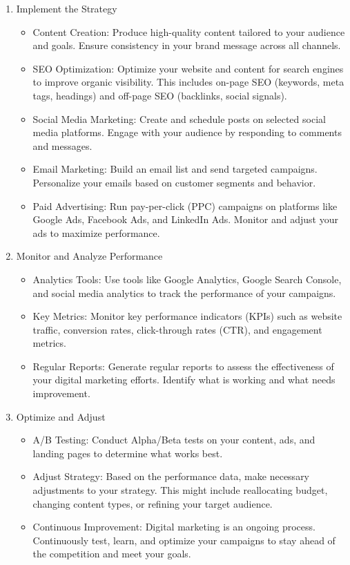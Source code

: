 \begin{enumerate}
    \item Implement the Strategy
    \begin{itemize}
        \item Content Creation: Produce high-quality content tailored to your audience and goals. Ensure consistency in your brand message across all channels.
        \item SEO Optimization: Optimize your website and content for search engines to improve organic visibility. This includes on-page SEO (keywords, meta tags, headings) and off-page SEO (backlinks, social signals).
        \item Social Media Marketing: Create and schedule posts on selected social media platforms. Engage with your audience by responding to comments and messages.
        \item Email Marketing: Build an email list and send targeted campaigns. Personalize your emails based on customer segments and behavior.
        \item Paid Advertising: Run pay-per-click (PPC) campaigns on platforms like Google Ads, Facebook Ads, and LinkedIn Ads. Monitor and adjust your ads to maximize performance.
    \end{itemize}

    \item Monitor and Analyze Performance
    \begin{itemize}
        \item Analytics Tools: Use tools like Google Analytics, Google Search Console, and social media analytics to track the performance of your campaigns.
        \item Key Metrics: Monitor key performance indicators (KPIs) such as website traffic, conversion rates, click-through rates (CTR), and engagement metrics.
        \item Regular Reports: Generate regular reports to assess the effectiveness of your digital marketing efforts. Identify what is working and what needs improvement.
    \end{itemize}

    \item Optimize and Adjust
    \begin{itemize}
        \item A/B Testing: Conduct Alpha/Beta tests on your content, ads, and landing pages to determine what works best.
        \item Adjust Strategy: Based on the performance data, make necessary adjustments to your strategy. This might include reallocating budget, changing content types, or refining your target audience.
        \item Continuous Improvement: Digital marketing is an ongoing process. Continuously test, learn, and optimize your campaigns to stay ahead of the competition and meet your goals.
    \end{itemize}
\end{enumerate}

